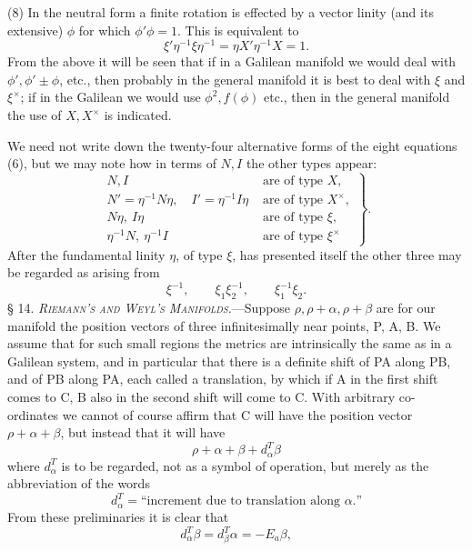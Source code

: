 \documentclass[11pt]{article}
\begin{document}
\indent (8) In the neutral form a finite rotation is effected by a vector linity (and its extensive) $\phi$ for which $\phi'\phi=1$. This is equivalent to
\[
\xi'\eta^{-1}\xi\eta^{-1}=\eta X'\eta^{-1}X=1.
\]
From the above it will be seen that if in a Galilean manifold we would deal with $\phi',\phi'\pm\phi$, etc., then probably in the general manifold it is best to deal with $\xi$ and $\xi^\times$; if in the Galilean we would use $\phi^2,f(\phi)$ etc., then in the general manifold the use of $X,X^\times$ is indicated.

\indent We need not write down the twenty-four alternative forms of the eight equations (6), but we may note how in terms of $N,I$ the other types appear:
\begin{equation}\left.\begin{aligned}
N,I&\text{ are of type }X,\\
N'=\eta^{-1}N\eta,\quad I'=\eta^{-1}I\eta&\text{ are of type }X^\times,\\
N\eta,\ I\eta&\text{ are of type }\xi,\\
\eta^{-1}N,\ \eta^{-1}I&\text{ are of type }\xi^\times
\end{aligned}\right\}.\tag{9}\end{equation}
After the fundamental linity $\eta$, of type $\xi$, has presented itself the other three may be regarded as arising from
\[
\xi^{-1},\qquad\xi_1\xi_2^{-1},\qquad\xi_1^{-1}\xi_2.
\]
\noindent\textsc{§ 14. \emph{Riemann's and Weyl's Manifolds.}}---Suppose $\rho,\rho+\alpha,\rho+\beta$ are for our manifold the position vectors of three infinitesimally near points, P, A, B. We assume that for such small regions the metrics are intrinsically the same as in a Galilean system, and in particular that there is a definite shift of PA along PB, and of PB along PA, each called a translation, by which if A in the first shift comes to C, B also in the second shift will come to C. With arbitrary co-ordinates we cannot of course affirm that C will have the position vector $\rho+\alpha+\beta$, but instead that it will have
\[
\rho+\alpha+\beta+d_\alpha^T\beta
\]
where $d_\alpha^T$ is to be regarded, not as a symbol of operation, but merely as the abbreviation of the words
\begin{equation}d_\alpha^T=\text{``increment due to translation along }\alpha\text{.''}\tag{1}\end{equation}
From these preliminaries it is clear that
\begin{equation}d_\alpha^T\beta=d_\beta^T\alpha=-E_a\beta,\tag{2}\end{equation}
\end{document}

